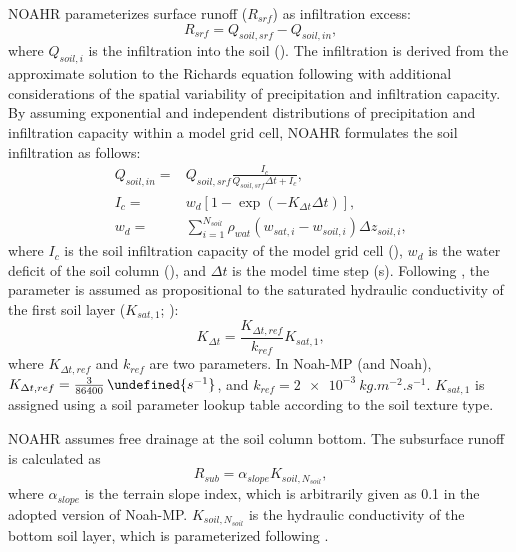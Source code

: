 \documentclass[essd, manuscript]{copernicus}
\let\unit\undefined
\begin{document}
NOAHR parameterizes surface runoff (\(R_{srf}\)) as infiltration excess:
\begin{equation}
  R_{srf} = Q_{soil,srf} - Q_{soil,in}
  \text{,}
\end{equation}
where \(Q_{soil,i}\) is the infiltration into the soil (\unit{kg.m^{-2}.s^{-1}}). The infiltration is derived from the approximate solution to the Richards equation following \citet{philip1969AiH} with additional considerations of the spatial variability of precipitation and infiltration capacity. By assuming exponential and independent distributions of precipitation and infiltration capacity within a model grid cell, NOAHR formulates the soil infiltration as follows:
\begin{align}
  Q_{soil,in} = & Q_{soil,srf} \frac{I_c}{Q_{soil,srf} \Delta t + I_c}
  \text{,} \\
  I_{c} =       & w_d [1-\exp(-K_{\Delta t} \Delta t)]
  \text{,} \\
  w_d =         & \sum_{i=1}^{N_{soil}} \rho_{wat} (w_{sat,i} - w_{soil,i}) \Delta z_{soil,i}
  \text{,}
\end{align}
where \(I_{c}\) is the soil infiltration capacity of the model grid cell (\unit{kg.m^{-2}}), \(w_d\) is the water deficit of the soil column (\unit{kg.m^{-2}}), and \(\Delta t\) is the model time step (s). Following \citet{chen2001MWR}, the parameter is assumed as propositional to the saturated hydraulic conductivity of the first soil layer (\(K_{sat,1}\); \unit{kg.m^{-2}.s^{-1}}):
\begin{equation}
  K_{\Delta t} = \frac{K_{\Delta t,ref}}{k_{ref}} K_{sat,1}
  \text{,}
\end{equation}
where \(K_{\Delta t,ref}\) and \(k_{ref}\) are two parameters. In Noah-MP (and Noah), \(K_{\Delta t,ref} = \frac{3}{86400}\,\unit{s^{-1}}\), and \(k_{ref}=\qty{2e-3}{kg.m^{-2}.s^{-1}}\). \(K_{sat,1}\) is assigned using a soil parameter lookup table according to the soil texture type.

NOAHR assumes free drainage at the soil column bottom. The subsurface runoff is calculated as
\begin{equation}
  R_{sub} = \alpha_{slope} K_{soil,N_{soil}} \label{eq:noahr:rsub}
  \text{,}
\end{equation}
where \(\alpha_{slope}\) is the terrain slope index, which is arbitrarily given as 0.1 in the adopted version of Noah-MP\@. \(K_{soil,N_{soil}}\) is the hydraulic conductivity of the bottom soil layer, which is parameterized following \citet{clapp1978WRR}.
\end{document}
